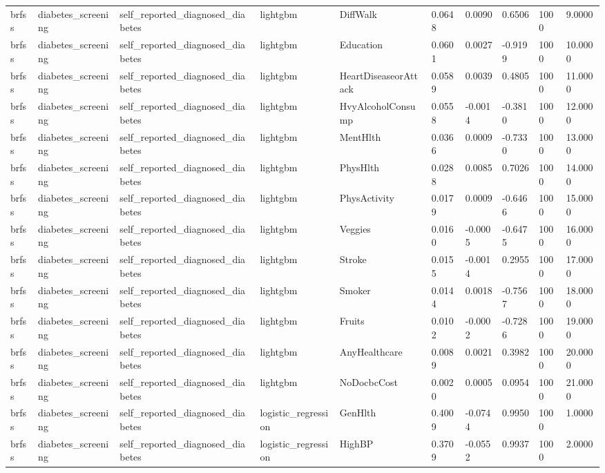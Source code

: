 \begin{tabular}{llllllllll}
brfss & diabetes\_screening & self\_reported\_diagnosed\_diabetes & lightgbm & DiffWalk & 0.0648 & 0.0090 & 0.6506 & 1000 & 9.0000 \\
brfss & diabetes\_screening & self\_reported\_diagnosed\_diabetes & lightgbm & Education & 0.0601 & 0.0027 & -0.9199 & 1000 & 10.0000 \\
brfss & diabetes\_screening & self\_reported\_diagnosed\_diabetes & lightgbm & HeartDiseaseorAttack & 0.0589 & 0.0039 & 0.4805 & 1000 & 11.0000 \\
brfss & diabetes\_screening & self\_reported\_diagnosed\_diabetes & lightgbm & HvyAlcoholConsump & 0.0558 & -0.0014 & -0.3810 & 1000 & 12.0000 \\
brfss & diabetes\_screening & self\_reported\_diagnosed\_diabetes & lightgbm & MentHlth & 0.0366 & 0.0009 & -0.7330 & 1000 & 13.0000 \\
brfss & diabetes\_screening & self\_reported\_diagnosed\_diabetes & lightgbm & PhysHlth & 0.0288 & 0.0085 & 0.7026 & 1000 & 14.0000 \\
brfss & diabetes\_screening & self\_reported\_diagnosed\_diabetes & lightgbm & PhysActivity & 0.0179 & 0.0009 & -0.6466 & 1000 & 15.0000 \\
brfss & diabetes\_screening & self\_reported\_diagnosed\_diabetes & lightgbm & Veggies & 0.0160 & -0.0005 & -0.6475 & 1000 & 16.0000 \\
brfss & diabetes\_screening & self\_reported\_diagnosed\_diabetes & lightgbm & Stroke & 0.0155 & -0.0014 & 0.2955 & 1000 & 17.0000 \\
brfss & diabetes\_screening & self\_reported\_diagnosed\_diabetes & lightgbm & Smoker & 0.0144 & 0.0018 & -0.7567 & 1000 & 18.0000 \\
brfss & diabetes\_screening & self\_reported\_diagnosed\_diabetes & lightgbm & Fruits & 0.0102 & -0.0002 & -0.7286 & 1000 & 19.0000 \\
brfss & diabetes\_screening & self\_reported\_diagnosed\_diabetes & lightgbm & AnyHealthcare & 0.0089 & 0.0021 & 0.3982 & 1000 & 20.0000 \\
brfss & diabetes\_screening & self\_reported\_diagnosed\_diabetes & lightgbm & NoDocbcCost & 0.0020 & 0.0005 & 0.0954 & 1000 & 21.0000 \\
brfss & diabetes\_screening & self\_reported\_diagnosed\_diabetes & logistic\_regression & GenHlth & 0.4009 & -0.0744 & 0.9950 & 1000 & 1.0000 \\
brfss & diabetes\_screening & self\_reported\_diagnosed\_diabetes & logistic\_regression & HighBP & 0.3709 & -0.0552 & 0.9937 & 1000 & 2.0000 \\

\end{tabular}
